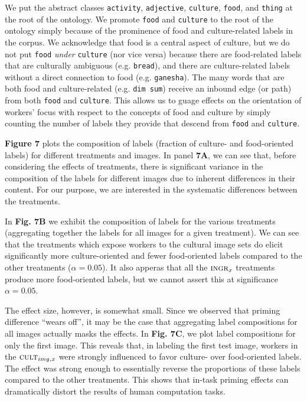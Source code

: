 \documentclass[a4paper]{report}
\begin{document}
We put the abstract classes  \texttt{activity}, 
\texttt{adjective}, \texttt{culture}, \texttt{food}, and \texttt{thing} at 
the root of the ontology.  We promote \texttt{food} and \texttt{culture}
to the root of the ontology simply because of the prominence of food and 
culture-related labels in the corpus.  We acknowledge that food is a 
central aspect of culture, but we do not put \texttt{food} \textit{under} 
\texttt{culture}
(nor vice versa) because there are food-related labels that are culturally 
ambiguous (e.g. \texttt{bread}), and there are culture-related labels without 
a direct connection to food (e.g. \texttt{ganesha}).  The many words that are 
both food and culture-related (e.g. \texttt{dim sum}) receive an inbound edge 
(or path) from both \texttt{food} and \texttt{culture}.
This allows us to guage effects on the orientation of workers' focus
with respect to the concepts of food and culture by simply counting the number 
of labels they provide that descend from \texttt{food} and \texttt{culture}. 

\textbf{Figure 7} plots the composition of labels (fraction of culture- and 
food-oriented labels) for different treatments and images.  In 
panel \textbf{7A}, we can see that, before considering the effects of 
treatments, there is significant variance in the composition of the labels 
for different images due to inherent differences in their content.  For our 
purpose, we are interested in the systematic differences between 
the treatments.

In \textbf{Fig. 7B} we exhibit the composition of labels for the various 
treatments (aggregating together the labels for all images for a given 
treatment).  We can see that the treatments which expose workers to the
cultural image sets do elicit significantly more culture-oriented and fewer
food-oriented labels compared to the other treatments ($\alpha=0.05$).  It 
also apperas that all the $\textsc{ingr}_x$ treatments produce more 
food-oriented labels, but we cannot assert this at significance 
$\alpha = 0.05$. 

The effect size, however, is somewhat small.  Since we observed that priming 
difference ``wears off'', it may be the case 
that aggregating label compositions for all images actually masks the effects. 
In \textbf{Fig. 7C}, we plot label compositions for only the first
image.  This reveals that, in labeling the first test image, workers in the
$\textsc{cult}_{img,x}$ were strongly influenced to favor culture- over 
food-oriented labels.  The effect was strong enough to essentially reverse 
the proportions of these labels compared to the other treatments.  
This shows that in-task priming effects can dramatically distort the results 
of human computation tasks.
\end{document}
